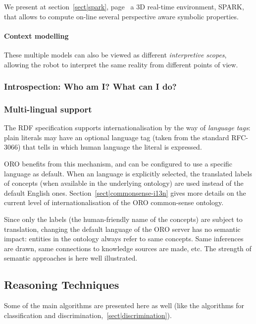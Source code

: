 We present at section~\ref{sect|spark}, page~\pageref{sect|spark} a 3D
real-time environment, SPARK, that allows to compute on-line several
perspective aware symbolic properties.

\paragraph{Context modelling}

These multiple models can also be viewed as different \emph{interpretive
scopes}, allowing the robot to interpret the same reality from different points
of view.



\subsubsection{Introspection: Who am I? What can I do?}

\subsubsection{Multi-lingual support}
\label{sect|multilingual}

The RDF specification supports internationalisation by the way of
\emph{language tags}: plain literals may have an optional language tag (taken
from the standard RFC-3066) that tells in which human language the literal is
expressed.

ORO benefits from this mechanism, and can be configured to use a specific
language as default. When an language is explicitly selected, the translated
labels of concepts (when available in the underlying ontology) are used instead
of the default English ones. Section~\ref{sect|commonsense-i13n} gives more
details on the current level of internationalisation of the ORO common-sense
ontology.

Since only the labels (\ie the human-friendly name of the concepts) are subject
to translation, changing the default language of the ORO server has no semantic
impact: entities in the ontology always refer to same concepts. Same inferences
are drawn, same connections to knowledge sources are made, etc. The strength of
semantic approaches is here well illustrated.

\subsection{Reasoning Techniques}

Some of the main algorithms are presented here as well (like the algorithms for
classification and discrimination,~\ref{sect|discrimination}).


